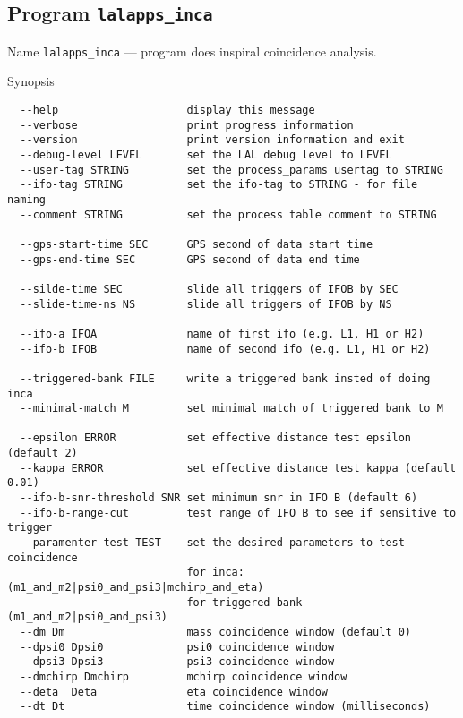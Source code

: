 \subsection{Program \texttt{lalapps\_inca}}
\label{program:lalapps-inca}

\begin{entry}
\item[Name]
\verb$lalapps_inca$ --- program does inspiral coincidence analysis.

\item[Synopsis]
\begin{verbatim}
  --help                    display this message
  --verbose                 print progress information
  --version                 print version information and exit
  --debug-level LEVEL       set the LAL debug level to LEVEL
  --user-tag STRING         set the process_params usertag to STRING
  --ifo-tag STRING          set the ifo-tag to STRING - for file naming
  --comment STRING          set the process table comment to STRING
 
  --gps-start-time SEC      GPS second of data start time
  --gps-end-time SEC        GPS second of data end time
 
  --silde-time SEC          slide all triggers of IFOB by SEC
  --slide-time-ns NS        slide all triggers of IFOB by NS
 
  --ifo-a IFOA              name of first ifo (e.g. L1, H1 or H2)
  --ifo-b IFOB              name of second ifo (e.g. L1, H1 or H2)
 
  --triggered-bank FILE     write a triggered bank insted of doing inca
  --minimal-match M         set minimal match of triggered bank to M
 
  --epsilon ERROR           set effective distance test epsilon (default 2)
  --kappa ERROR             set effective distance test kappa (default 0.01)
  --ifo-b-snr-threshold SNR set minimum snr in IFO B (default 6)
  --ifo-b-range-cut         test range of IFO B to see if sensitive to trigger
  --paramenter-test TEST    set the desired parameters to test coincidence
                            for inca: (m1_and_m2|psi0_and_psi3|mchirp_and_eta)
                            for triggered bank (m1_and_m2|psi0_and_psi3)
  --dm Dm                   mass coincidence window (default 0)
  --dpsi0 Dpsi0             psi0 coincidence window
  --dpsi3 Dpsi3             psi3 coincidence window
  --dmchirp Dmchirp         mchirp coincidence window
  --deta  Deta              eta coincidence window
  --dt Dt                   time coincidence window (milliseconds)
 

\end{verbatim}
\end{entry}
